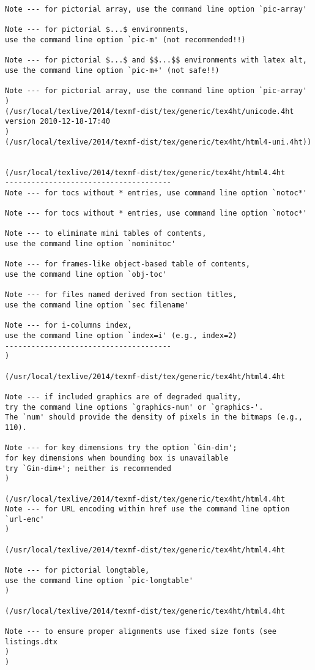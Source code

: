 \begin{Verbatim}[fontsize=\tiny]
Note --- for pictorial array, use the command line option `pic-array'

Note --- for pictorial $...$ environments, 
use the command line option `pic-m' (not recommended!!)

Note --- for pictorial $...$ and $$...$$ environments with latex alt, 
use the command line option `pic-m+' (not safe!!)

Note --- for pictorial array, use the command line option `pic-array'
)
(/usr/local/texlive/2014/texmf-dist/tex/generic/tex4ht/unicode.4ht
version 2010-12-18-17:40
)
(/usr/local/texlive/2014/texmf-dist/tex/generic/tex4ht/html4-uni.4ht))


(/usr/local/texlive/2014/texmf-dist/tex/generic/tex4ht/html4.4ht
--------------------------------------
Note --- for tocs without * entries, use command line option `notoc*'

Note --- for tocs without * entries, use command line option `notoc*'

Note --- to eliminate mini tables of contents, 
use the command line option `nominitoc'

Note --- for frames-like object-based table of contents, 
use the command line option `obj-toc'

Note --- for files named derived from section titles, 
use the command line option `sec filename'

Note --- for i-columns index, 
use the command line option `index=i' (e.g., index=2)
--------------------------------------
)

(/usr/local/texlive/2014/texmf-dist/tex/generic/tex4ht/html4.4ht

Note --- if included graphics are of degraded quality, 
try the command line options `graphics-num' or `graphics-'. 
The `num' should provide the density of pixels in the bitmaps (e.g., 110). 

Note --- for key dimensions try the option `Gin-dim'; 
for key dimensions when bounding box is unavailable 
try `Gin-dim+'; neither is recommended
)

(/usr/local/texlive/2014/texmf-dist/tex/generic/tex4ht/html4.4ht
Note --- for URL encoding within href use the command line option `url-enc'
)

(/usr/local/texlive/2014/texmf-dist/tex/generic/tex4ht/html4.4ht

Note --- for pictorial longtable, 
use the command line option `pic-longtable'
)

(/usr/local/texlive/2014/texmf-dist/tex/generic/tex4ht/html4.4ht

Note --- to ensure proper alignments use fixed size fonts (see listings.dtx
)
)
\end{Verbatim}

